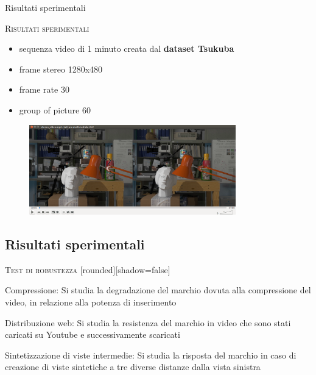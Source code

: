 \documentclass{beamer}
\begin{document}
\begin{section}{Risultati sperimentali}

\begin{frame}[t]{\textsc{Risultati sperimentali}}

\begin{itemize}
\item sequenza video di 1 minuto creata dal \textbf{dataset Tsukuba}
\item frame stereo 1280x480
\item frame rate 30
\item group of picture 60
\end{itemize}

\vspace{2mm}
\begin{figure}
  \includegraphics[width=0.8\textwidth]{./img_wat/video_stereo.png}  
  \label{fig:video}
\end{figure}
\end{frame}

\subsection{Risultati sperimentali}

\begin{frame}[t]{\textsc{Test di robustezza}}
[rounded][shadow=false]
\begin{block}{Compressione:}
Si studia la degradazione del marchio dovuta alla compressione del video, in relazione alla potenza di inserimento
\end{block}
\begin{block}{Distribuzione web:}
Si studia la resistenza del marchio in video che sono stati caricati su Youtube e successivamente scaricati
\end{block}
\begin{block}{Sintetizzazione di viste intermedie:}
Si studia la risposta del marchio in caso di creazione di viste sintetiche a tre diverse distanze dalla vista sinistra
\end{block}


\end{frame}
\end{section}
\end{document}
